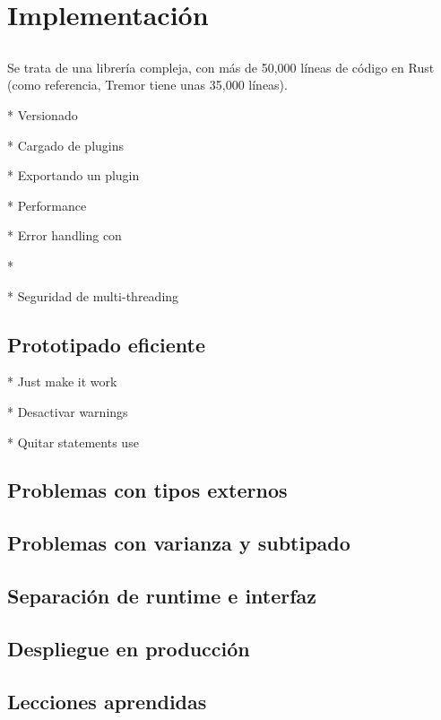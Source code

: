 
\chapter{Implementación}

\section{}

Se trata de una librería compleja, con más de 50,000 líneas de código en Rust
(como referencia, Tremor tiene unas 35,000 líneas).

* Versionado

* Cargado de plugins

* Exportando un plugin

* Performance

* Error handling con 

* 

* Seguridad de multi-threading

\section{Prototipado eficiente}

* Just make it work

* Desactivar warnings

* Quitar statements use

\section{Problemas con tipos externos}

\section{Problemas con varianza y subtipado}

\section{Separación de runtime e interfaz}

\section{Despliegue en producción}

\section{Lecciones aprendidas}

